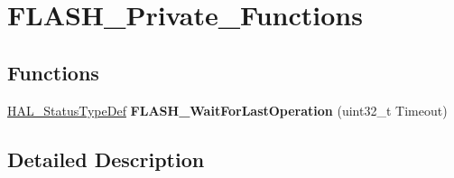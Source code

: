 \hypertarget{group___f_l_a_s_h___private___functions}{}\section{F\+L\+A\+S\+H\+\_\+\+Private\+\_\+\+Functions}
\label{group___f_l_a_s_h___private___functions}
\subsection*{Functions}
\begin{DoxyCompactItemize}
\item 
\mbox{\label{group___f_l_a_s_h___private___functions_gaf89afc110a32ac9dcf0d06b89ffd9224}} 
\hyperlink{stm32f1xx__hal__def_8h_a63c0679d1cb8b8c684fbb0632743478f}{H\+A\+L\+\_\+\+Status\+Type\+Def} {\bfseries F\+L\+A\+S\+H\+\_\+\+Wait\+For\+Last\+Operation} (uint32\+\_\+t Timeout)
\end{DoxyCompactItemize}


\subsection{Detailed Description}
